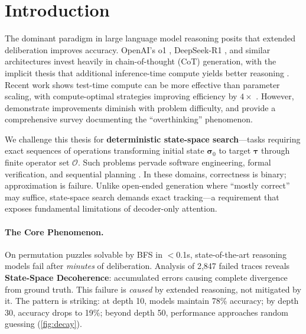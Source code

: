 \documentclass{article}
\theoremstyle{plain}
\theoremstyle{definition}
\theoremstyle{remark}
\newcommand{\state}{\boldsymbol{\sigma}}
\newcommand{\target}{\boldsymbol{\tau}}
\newcommand{\ops}{\mathcal{O}}
\begin{document}
\section{Introduction}
\label{sec:intro}

The dominant paradigm in large language model reasoning posits that extended deliberation improves accuracy. OpenAI's o1 \citep{openai2024o1}, DeepSeek-R1 \citep{guo2025deepseek}, and similar architectures invest heavily in chain-of-thought (CoT) generation, with the implicit thesis that additional inference-time compute yields better reasoning \citep{snell2024scaling,brown2024large}. Recent work shows test-time compute can be more effective than parameter scaling, with compute-optimal strategies improving efficiency by $4\times$ \citep{snell2024scaling,li2024scaling}. However, \citet{balachandran2025inference} demonstrate improvements diminish with problem difficulty, and \citet{sui2025stop} provide a comprehensive survey documenting the ``overthinking'' phenomenon.

We challenge this thesis for \textbf{deterministic state-space search}---tasks requiring exact sequences of operations transforming initial state $\state_0$ to target $\target$ through finite operator set $\ops$. Such problems pervade software engineering, formal verification, and sequential planning \citep{dziri2024faith,kambhampati2024llms,valmeekam2023planning}. In these domains, correctness is binary; approximation is failure. Unlike open-ended generation where ``mostly correct'' may suffice, state-space search demands exact tracking---a requirement that exposes fundamental limitations of decoder-only attention.

\paragraph{The Core Phenomenon.} On permutation puzzles solvable by BFS in $<$0.1s, state-of-the-art reasoning models fail after \emph{minutes} of deliberation. Analysis of 2,847 failed traces reveals \textbf{State-Space Decoherence}: accumulated errors causing complete divergence from ground truth. This failure is \emph{caused} by extended reasoning, not mitigated by it. The pattern is striking: at depth 10, models maintain 78\% accuracy; by depth 30, accuracy drops to 19\%; beyond depth 50, performance approaches random guessing (\cref{fig:decay}).
\end{document}
